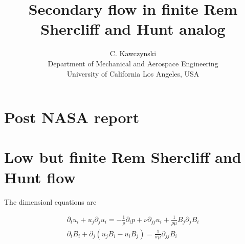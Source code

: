 \documentclass[11pt]{article}
\newcommand{\PD}{\partial}
\begin{document}
\doublespacing
\title{Secondary flow in finite Rem Shercliff and Hunt analog}
\author{C. Kawczynski \\
Department of Mechanical and Aerospace Engineering \\
University of California Los Angeles, USA\\
}
\maketitle

\section{Post NASA report}

\section{Low but finite Rem Shercliff and Hunt flow}
The dimensionl equations are

\begin{equation}\begin{aligned}
\PD_t u_i + u_j \PD_j u_i = - \frac{1}{\rho} \PD_i p + \nu \PD_{jj} u_i + \frac{1}{\rho \mu} B_j \PD_j B_i \\
\PD_t B_i + \PD_j (u_j B_i - u_i B_j) = \frac{1}{\sigma \mu} \PD_{jj} B_i
\end{aligned} \end{equation}
\end{document}
